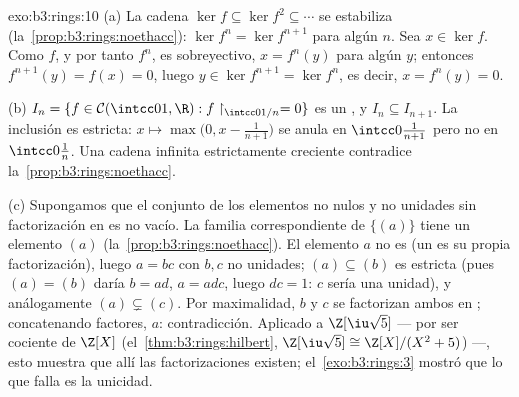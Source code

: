 \begin{solution}{exo:b3:rings:10}
(a) La cadena $\ker f \subseteq \ker f^2 \subseteq \cdots$ se estabiliza
(la~\cref{prop:b3:rings:noethacc}): $\ker f^n = \ker
f^{n+1}$ para algún $n$. Sea $x \in \ker f$. Como $f$, y por tanto
$f^n$, es sobreyectivo, $x = f^n(y)$ para algún $y$; entonces
$f^{n+1}(y) = f(x) =
0$, luego $y \in \ker f^{n+1} = \ker f^n$, es decir, $x = f^n(y) = 0$.

(b) $I_n = \{f \in \mathcal C(\intcc01, \R) : f\restriction_{
\intcc0{1/n}} = 0\}$ es un , y
$I_n \subseteq I_{n+1}$. La inclusión es estricta:
$x \mapsto \max\bigl(0, x -
\frac1{n+1}\bigr)$ se anula en $\intcc0{\frac1{n+1}}$ pero no en
$\intcc0{\frac1n}$. Una cadena infinita estrictamente creciente
contradice la~\cref{prop:b3:rings:noethacc}.

(c) Supongamos que el conjunto de los elementos no nulos y no unidades
sin factorización en  es
no vacío. La familia correspondiente de
 $\{(a)\}$ tiene un elemento
 $(a)$
(la~\cref{prop:b3:rings:noethacc}). El elemento $a$ no es
 (un
 es su propia
factorización), luego $a = bc$ con $b, c$ no unidades;
$(a) \subseteq (b)$ es estricta (pues $(a) =
(b)$ daría $b = ad$, $a = adc$, luego $dc = 1$: $c$ sería una unidad), y
análogamente $(a) \subsetneq (c)$. Por maximalidad, $b$ y $c$ se
factorizan ambos en ;
concatenando factores, $a$: contradicción. Aplicado a $\Z[\iu\sqrt5]$
---  por ser cociente de
$\Z[X]$ (el~\cref{thm:b3:rings:hilbert}, $\Z[\iu\sqrt5]
\cong \Z[X]/(X^2+5)$) ---, esto muestra que allí las factorizaciones
existen; el~\cref{exo:b3:rings:3} mostró que lo que falla es la
unicidad.
\end{solution}

